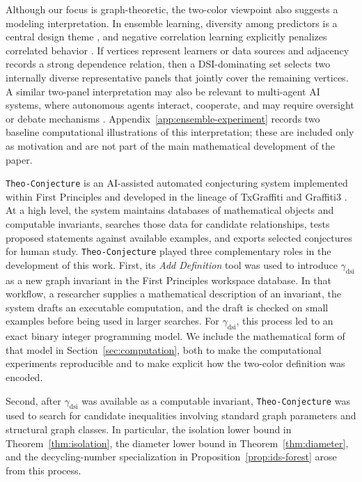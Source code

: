 \documentclass[11pt]{article}
\theoremstyle{definition}
\theoremstyle{remark}
\newcommand{\dsi}{\mathrm{dsi}}
\DeclareRobustCommand{\TheoConjecture}{\texttt{Theo-Conjecture}}
\DeclareRobustCommand{\AddDefinition}{\emph{Add Definition}}
\begin{document}
Although our focus is graph-theoretic, the two-color viewpoint also suggests
a modeling interpretation. In ensemble learning, diversity among predictors
is a central design theme \cite{Brown05,Dietterich00,Kuncheva04}, and
negative correlation learning explicitly penalizes correlated behavior
\cite{LiuYao99}. If vertices represent learners or data sources and
adjacency records a strong dependence relation, then a DSI-dominating set
selects two internally diverse representative panels that jointly cover the
remaining vertices. A similar two-panel interpretation may also be relevant
to multi-agent AI systems, where autonomous agents interact, cooperate, and
may require oversight or debate mechanisms
\cite{DafoeEtAl20,
IrvingChristianoAmodei18,ShohamLeytonBrown08,Wooldridge09}. Appendix~\ref{app:ensemble-experiment} records
two baseline computational illustrations of this interpretation; these are
included only as  motivation and are not part of the main
mathematical development of the paper.

\TheoConjecture{} is an AI-assisted automated conjecturing system implemented
within First Principles and developed in the lineage of TxGraffiti and
Graffiti3 \cite{DavilaTxGraffiti,DavilaGraffiti3}. At a high level, the
system maintains databases of mathematical objects and computable
invariants, searches those data for candidate relationships, tests proposed
statements against available examples, and exports selected conjectures for
human study. \TheoConjecture{} played three complementary roles in the
development of this work. First, its \AddDefinition{} tool was used
to introduce \(\gamma_{\dsi}\) as a new graph invariant in the First
Principles workspace database. In that workflow, a researcher supplies a
mathematical description of an invariant, the system drafts an executable
computation, and the draft is checked on small examples before being used in
larger searches. For \(\gamma_{\dsi}\), this process led to an exact binary
integer programming model. We include the mathematical form of that model in
Section~\ref{sec:computation}, both to make the computational experiments
reproducible and to make explicit how the two-color definition was encoded.

Second, after \(\gamma_{\dsi}\) was available as a computable invariant,
\TheoConjecture{} was used to search for candidate inequalities involving
standard graph parameters and structural graph classes. In particular, the
isolation lower bound in Theorem~\ref{thm:isolation}, the diameter lower
bound in Theorem~\ref{thm:diameter}, and the decycling-number specialization
in Proposition~\ref{prop:ids-forest} arose from this process.
\end{document}
